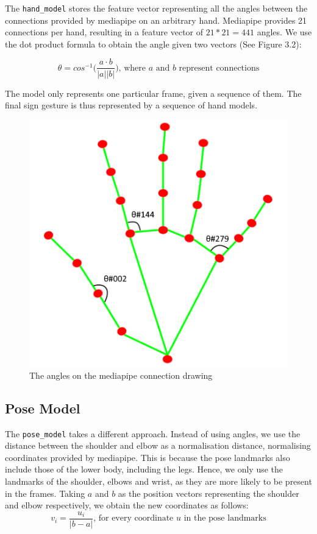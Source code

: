 \documentclass[final,dissertation.tex]{subfiles}
\begin{document}
The \verb|hand_model| stores the feature vector representing all the angles between the connections provided by mediapipe on an arbitrary hand. Mediapipe provides 21 connections per hand, resulting in a feature vector of $21 * 21 = 441$ angles. We use the dot product formula to obtain the angle given two vectors (See Figure 3.2):

\begin{equation*}
    \theta = cos^{-1}\Big(\frac{a \cdot b}{|a| |b|}\Big) \text{, where $a$ and $b$ represent connections}
\end{equation*}

The model only represents one particular frame, given a sequence of them. The final sign gesture is thus represented by a sequence of hand models.

\begin{figure}[H]
    \begin{center}
        \includegraphics[scale=0.7]{images/hand_landmarks.png}
        \caption{The angles on the mediapipe connection drawing}
    \end{center}
\end{figure}


\subsection*{Pose Model}

The \verb|pose_model| takes a different approach. Instead of using angles, we use the distance between the shoulder and elbow as a normalisation distance, normalising coordinates provided by mediapipe. This is because the pose landmarks also include those of the lower body, including the legs. Hence, we only use the landmarks of the shoulder, elbows and wrist, as they are more likely to be present in the frames. Taking $a$ and $b$ as the position vectors representing the shoulder and elbow respectively, we obtain the new coordinates as follows:
\begin{equation*}
    v_i = \frac{u_i}{|b - a|} \text{, for every coordinate $u$ in the pose landmarks}
\end{equation*}
\end{document}
